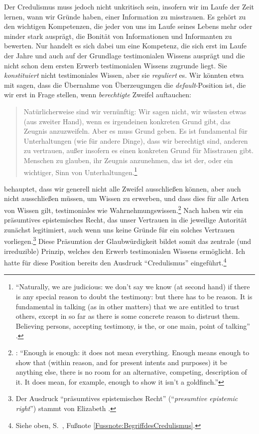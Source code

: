 Der Credulismus muss jedoch nicht unkritisch sein, insofern wir im Laufe der
Zeit lernen, wann wir Gründe haben, einer Information zu misstrauen. Es gehört
zu den wichtigen Kompetenzen, die jeder von uns im Laufe seines Lebens mehr oder
minder stark ausprägt, die Bonität von Informationen und Informanten zu
bewerten. Nur handelt es sich dabei um eine Kompetenz, die sich erst im Laufe
der Jahre und auch auf der Grundlage testimonialen Wissens ausprägt und die
nicht schon dem ersten Erwerb testimonialen Wissens zugrunde liegt. Sie
\emph{konstituiert} nicht testimoniales Wissen, aber sie \emph{reguliert} es.
Wir könnten etwa mit  sagen, dass die
Übernahme von Überzeugungen die \emph{default}-Position ist, die wir erst in
Frage stellen, wenn \emph{berechtigte} Zweifel auftauchen:
\begin{quote}
Natürlicherweise sind wir vernünftig: Wir sagen nicht, wir wüssten etwas (aus
zweiter Hand), wenn es irgendeinen konkreten Grund gibt, das Zeugnis
anzuzweifeln. Aber es muss  Grund geben. Es ist fundamental für
Unterhaltungen (wie für andere Dinge), dass wir berechtigt sind, anderen zu
vertrauen, außer insofern es einen konkreten Grund für Misstrauen gibt.
Menschen zu glauben, ihr Zeugnis anzunehmen, das ist der, oder ein wichtiger,
Sinn von Unterhaltungen.\footnote{\enquote{Naturally, we are judicious: we
don't say we know (at second hand) if there is any special reason to doubt the testimony: but there has to be
 reason. It is fundamental in talking (as in other matters) that we
are entitled to trust others, except in so far as there is some concrete reason
to distrust them. Believing persons, accepting testimony, is the, or one main,
point of talking} \parencite[][82]{Austin:OtherMinds1979}.}
\end{quote}
 behauptet, dass wir generell nicht alle Zweifel
ausschließen können, aber auch nicht ausschließen müssen, um Wissen zu erwerben, und dass
dies für alle Arten von Wissen gilt, testimoniales wie
Wahrnehmungswissen.\footnote{\cite[Vgl.][84]{Austin:OtherMinds1979}:
\enquote{Enough is enough: it does not mean everything. Enough means enough to
show that (within reason, and for present intents and purposes) it
 be anything else, there is no room for an alternative,
competing, description of it. It does  mean, for example, enough to
show it isn’t a  goldfinch.}} Nach  haben wir
ein präsumtives epistemisches Recht, das unser Vertrauen in die jeweilige Autorität
zunächst legitimiert, auch wenn uns keine Gründe für ein solches Vertrauen
vorliegen.\footnote{Der Ausdruck \enquote{präsumtives epistemisches Recht}
(\enquote{\emph{presumtive epistemic right}}) stammt von Elizabeth
\textcite[][140]{Fricker:AgainstGullibility1994}.} Diese Präsumtion der
Glaubwürdigkeit bildet somit das zentrale (und irreduzible) Prinzip, welches den
Erwerb testimonialen Wissens ermöglicht. Ich hatte für diese Position bereits
den Ausdruck \enquote{Credulismus} eingeführt.\footnote{Siehe oben,
S.~\pageref{Fussnote:BegriffdesCredulismus}, Fußnote
\ref{Fussnote:BegriffdesCredulismus}.}


